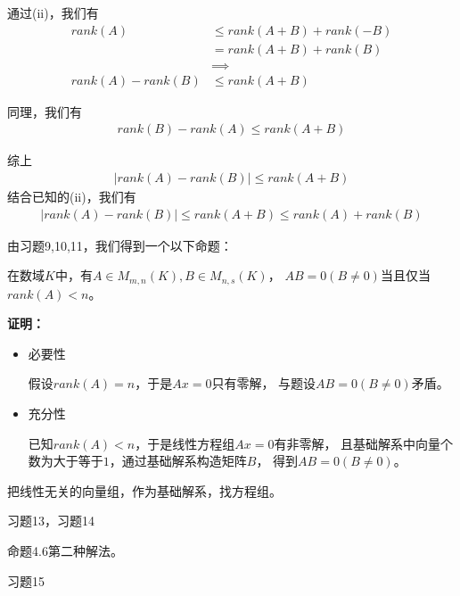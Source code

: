 \documentclass{article}
\begin{document}
通过(ii)，我们有
\begin{align*}
  rank(A)           & \leq rank(A + B) + rank(-B) \\
                    & = rank(A + B) + rank(B)     \\
                    & \implies                    \\
  rank(A) - rank(B) & \leq rank(A + B)
\end{align*}

同理，我们有
\begin{align*}
  rank(B) - rank(A) \leq rank(A + B)
\end{align*}

综上
\begin{align*}
  |rank(A) - rank(B)| \leq rank(A + B)
\end{align*}
结合已知的(ii)，我们有
\begin{align*}
  |rank(A) - rank(B)| \leq rank(A + B) \leq rank(A) + rank(B)
\end{align*}

\begin{zremark}
  由习题9,10,11，我们得到一个以下命题：

  在数域$K$中，有$A \in M_{m,n}(K), B \in M_{n,s}(K)$，
  $AB = 0 (B \neq 0)$当且仅当$rank(A) < n$。
\end{zremark}

\textbf{证明：}

\begin{itemize}
  \item 必要性

        假设$rank(A) = n$，于是$A x = 0$只有零解，
        与题设$A B = 0 (B \neq 0)$矛盾。

  \item 充分性

        已知$rank(A) < n$，于是线性方程组$Ax = 0$有非零解，
        且基础解系中向量个数为大于等于$1$，通过基础解系构造矩阵$B$，
        得到$AB = 0 (B \neq 0)$。
\end{itemize}

\begin{zremark}
  把线性无关的向量组，作为基础解系，找方程组。

  习题13，习题14
\end{zremark}

\begin{zremark}
  命题4.6第二种解法。

  习题15
\end{zremark}
\end{document}
